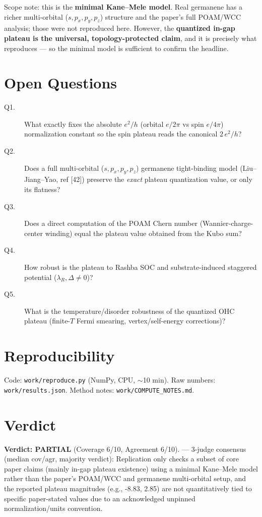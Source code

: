 \documentclass[11pt]{article}
\begin{document}
Scope note: this is the \textbf{minimal Kane--Mele model}. Real germanene has a richer
multi-orbital ($s,p_x,p_y,p_z$) structure and the paper's full POAM/WCC analysis; those
were not reproduced here. However, the \textbf{quantized in-gap plateau is the universal,
topology-protected claim}, and it is precisely what reproduces --- so the minimal model
is sufficient to confirm the headline.

\section{Open Questions}
\begin{description}
\item[Q1.] What exactly fixes the absolute $e^2/h$ (orbital $e/2\pi$ vs spin $e/4\pi$)
normalization constant so the spin plateau reads the canonical $2\,e^2/h$?
\item[Q2.] Does a full multi-orbital ($s,p_x,p_y,p_z$) germanene tight-binding model
(Liu--Jiang--Yao, ref [42]) preserve the \emph{exact} plateau quantization value, or only
its flatness?
\item[Q3.] Does a direct computation of the POAM Chern number (Wannier-charge-center
winding) equal the plateau value obtained from the Kubo sum?
\item[Q4.] How robust is the plateau to Rashba SOC and substrate-induced staggered
potential ($\lambda_R,\Delta\neq0$)?
\item[Q5.] What is the temperature/disorder robustness of the quantized OHC plateau
(finite-$T$ Fermi smearing, vertex/self-energy corrections)?
\end{description}

\section*{Reproducibility}
Code: \texttt{work/reproduce.py} (NumPy, CPU, $\sim$10 min). Raw numbers:
\texttt{work/results.json}. Method notes: \texttt{work/COMPUTE\_NOTES.md}.


\section{Verdict}
\textbf{Verdict: PARTIAL} (Coverage 6/10, Agreement 6/10). — 3-judge consensus (median cov/agr, majority verdict): Replication only checks a subset of core paper claims (mainly in-gap plateau existence) using a minimal Kane–Mele model rather than the paper’s POAM/WCC and germanene multi-orbital setup, and the reported plateau magnitudes (e.g., -8.83, 2.85) are not quantitatively tied to specific paper-stated values due to an acknowledged unpinned normalization/units convention.
\end{document}
